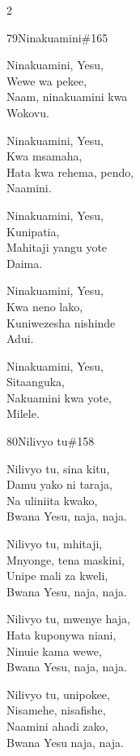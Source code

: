 \documentclass{article}
\begin{document}
\begin{multicols}{2}
\begin{hymn}{79}{Ninakuamini}{\#165}
\begin{stanza}
Ninakuamini, Yesu,\\
Wewe wa pekee,\\
Naam, ninakuamini kwa\\
Wokovu.
\end{stanza}
\begin{stanza}
Ninakuamini, Yesu,\\
Kwa msamaha,\\
Hata kwa rehema, pendo,\\
Naamini.
\end{stanza}
\begin{stanza}
Ninakuamini, Yesu,\\
Kunipatia,\\
Mahitaji yangu yote\\
Daima.
\end{stanza}
\begin{stanza}
Ninakuamini, Yesu,\\
Kwa neno lako,\\
Kuniwezesha nishinde\\
Adui.
\end{stanza}
\begin{stanza}
Ninakuamini, Yesu,\\
Sitaanguka,\\
Nakuamini kwa yote,\\
Milele.
\end{stanza}
\end{hymn}

\begin{hymn}{80}{Nilivyo tu}{\#158}
\begin{stanza}
Nilivyo tu, sina kitu,\\
Damu yako ni taraja,\\
Na uliniita kwako,\\
Bwana Yesu, naja, naja.
\end{stanza}
\begin{stanza}
Nilivyo tu, mhitaji,\\
Mnyonge, tena maskini,\\
Unipe mali za kweli,\\
Bwana Yesu, naja, naja.
\end{stanza}
\begin{stanza}
Nilivyo tu, mwenye haja,\\
Hata kuponywa niani,\\
Ninuie kama wewe,\\
Bwana Yesu, naja, naja.
\end{stanza}
\begin{stanza}
Nilivyo tu, unipokee,\\
Nisamehe, nisafishe,\\
Naamini ahadi zako,\\
Bwana Yesu naja, naja.
\end{stanza}
\end{hymn}


\end{multicols}
\end{document}
